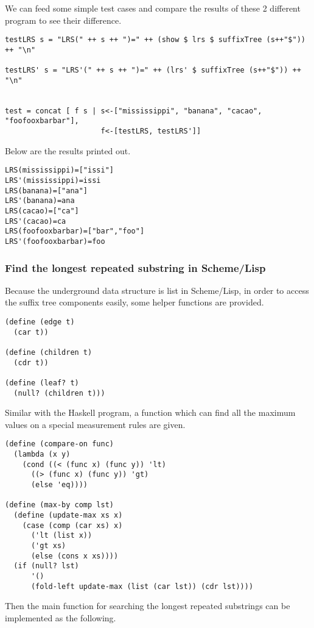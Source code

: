 \documentclass{article}
\begin{document}
We can feed some simple test cases and compare the results of 
these 2 different program to see their difference.

\begin{lstlisting}
testLRS s = "LRS(" ++ s ++ ")=" ++ (show $ lrs $ suffixTree (s++"$")) ++ "\n"

testLRS' s = "LRS'(" ++ s ++ ")=" ++ (lrs' $ suffixTree (s++"$")) ++ "\n"


test = concat [ f s | s<-["mississippi", "banana", "cacao", "foofooxbarbar"],
                      f<-[testLRS, testLRS']]
\end{lstlisting} %

Below are the results printed out.

\begin{verbatim}
LRS(mississippi)=["issi"]
LRS'(mississippi)=issi
LRS(banana)=["ana"]
LRS'(banana)=ana
LRS(cacao)=["ca"]
LRS'(cacao)=ca
LRS(foofooxbarbar)=["bar","foo"]
LRS'(foofooxbarbar)=foo
\end{verbatim}

\subsubsection*{Find the longest repeated substring in Scheme/Lisp}
Because the underground data structure is list in Scheme/Lisp, 
in order to access the suffix tree components easily, some helper
functions are provided.

\lstset{language=lisp}
\begin{lstlisting}
(define (edge t)
  (car t))

(define (children t)
  (cdr t))

(define (leaf? t)
  (null? (children t)))
\end{lstlisting}

Similar with the Haskell program, a function which can find all
the maximum values on a special measurement rules are given.

\begin{lstlisting}
(define (compare-on func)
  (lambda (x y) 
    (cond ((< (func x) (func y)) 'lt)
	  ((> (func x) (func y)) 'gt)
	  (else 'eq))))

(define (max-by comp lst)
  (define (update-max xs x)
    (case (comp (car xs) x)
      ('lt (list x))
      ('gt xs)
      (else (cons x xs))))
  (if (null? lst)
      '()
      (fold-left update-max (list (car lst)) (cdr lst))))
\end{lstlisting}

Then the main function for searching the longest repeated substrings
can be implemented as the following.
\end{document}
